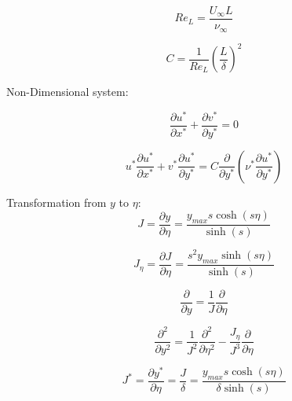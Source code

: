 \documentclass[letterpaper,12pt]{article}
\begin{document}





\begin{equation}
\boxed{
    Re_L = \frac{U_{\infty} L}{\nu_{\infty}}
}
\end{equation}

\begin{equation}
\boxed{
    C = \frac{1}{Re_L} \left( \frac{L}{\delta} \right)^2
}
\end{equation}

Non-Dimensional system:

\begin{equation}
\boxed{
    \frac{\partial u^*}{\partial x^*} + \frac{\partial v^*}{\partial y^*} = 0
}
\end{equation}

\begin{equation}
\boxed{
    u^* \frac{\partial u^*}{\partial x^*} + v^* \frac{\partial u^*}{\partial y^*} = C \frac{\partial}{\partial y^*} \left(\nu^* \frac{\partial u^*}{\partial y^*} \right)
}
\end{equation}

Transformation from $y$ to $\eta$:
\begin{equation}
\boxed{
    J = \frac{\partial y}{\partial \eta} = \frac{y_{max} s \cosh(s \eta)}{\sinh(s)}
}
\end{equation}

\begin{equation}
\boxed{
    J_{\eta} = \frac{\partial J}{\partial \eta} = \frac{s^2 y_{max} \sinh(s \eta)}{\sinh(s)}
}
\end{equation}

\begin{equation}
\boxed{
    \frac{\partial}{\partial y} = \frac{1}{J} \frac{\partial}{\partial \eta}
}
\end{equation}

\begin{equation}
\boxed{
    \frac{\partial^2}{\partial y^2} = \frac{1}{J^2} \frac{\partial^2}{\partial \eta^2} - \frac{J_{\eta}}{J^3} \frac{\partial}{\partial \eta}
}
\end{equation}


\begin{equation}
\boxed{
    J^* = \frac{\partial y^*}{\partial \eta} = \frac{J}{\delta} = \frac{y_{max} s \cosh(s \eta)}{\delta \sinh(s)}
}
\end{equation}
\end{document}
